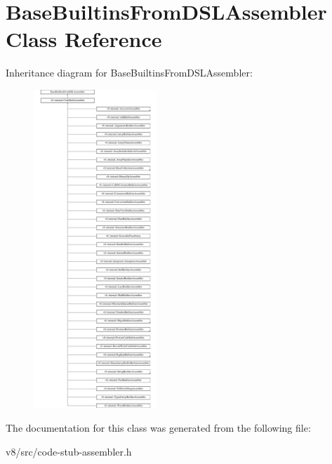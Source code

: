 \hypertarget{classBaseBuiltinsFromDSLAssembler}{}\section{Base\+Builtins\+From\+D\+S\+L\+Assembler Class Reference}
\label{classBaseBuiltinsFromDSLAssembler}
Inheritance diagram for Base\+Builtins\+From\+D\+S\+L\+Assembler\+:\begin{figure}[H]
\begin{center}
\leavevmode
\includegraphics[height=12.000000cm]{classBaseBuiltinsFromDSLAssembler}
\end{center}
\end{figure}


The documentation for this class was generated from the following file\+:\begin{DoxyCompactItemize}
\item 
v8/src/code-\/stub-\/assembler.\+h\end{DoxyCompactItemize}
